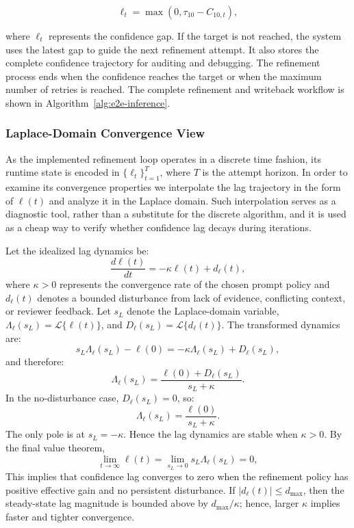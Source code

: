 \documentclass[pdflatex,sn-basic]{sn-jnl}
\begin{document}
\begin{equation}
\ell_t=\max(0,\tau_{10}-C_{10,t}),
\end{equation}

where $\ell_t$ represents the confidence gap. If the target is not reached,
the system uses the latest gap to guide the next refinement attempt. It also
stores the complete confidence trajectory for auditing and debugging. The
refinement process ends when the confidence reaches the target or when the
maximum number of retries is reached.
The complete refinement and writeback workflow is shown in Algorithm~\ref{alg:e2e-inference}.

\subsubsection{Laplace-Domain Convergence View}

As the implemented refinement loop operates in a discrete time fashion, its runtime state is encoded in \(\{\ell_t\}_{t=1}^{T}\), where $T$ is the attempt horizon. In order to examine its convergence properties we interpolate the lag trajectory in the form of \(\ell(t)\) and analyze it in the Laplace domain. Such interpolation serves as a diagnostic tool, rather than a substitute for the discrete algorithm, and it is used as a cheap way to verify whether confidence lag decays during iterations.

Let the idealized lag dynamics be:
\begin{equation}
\frac{d\ell(t)}{dt} = -\kappa \ell(t) + d_{\ell}(t),
\end{equation}
where \(\kappa>0\) represents the convergence rate of the chosen prompt policy and \(d_{\ell}(t)\) denotes a bounded disturbance from lack of evidence, conflicting context, or reviewer feedback. Let $s_L$ denote the Laplace-domain variable, $\Lambda_{\ell}(s_L)=\mathcal{L}\{\ell(t)\}$, and $D_{\ell}(s_L)=\mathcal{L}\{d_{\ell}(t)\}$. The transformed dynamics are:
\begin{equation}
s_L\Lambda_{\ell}(s_L)-\ell(0)=-\kappa\Lambda_{\ell}(s_L)+D_{\ell}(s_L),
\end{equation}
and therefore:
\begin{equation}
\Lambda_{\ell}(s_L)=\frac{\ell(0)+D_{\ell}(s_L)}{s_L+\kappa}.
\end{equation}
In the no-disturbance case, \(D_{\ell}(s_L)=0\), so:
\begin{equation}
\Lambda_{\ell}(s_L)=\frac{\ell(0)}{s_L+\kappa}.
\end{equation}
The only pole is at \(s_L=-\kappa\). Hence the lag dynamics are stable when \(\kappa>0\). By the final value theorem,
\begin{equation}
\lim_{t\to\infty}\ell(t)=\lim_{s_L\to 0}s_L\Lambda_{\ell}(s_L)=0,
\end{equation}
This implies that confidence lag converges to zero when the refinement policy has positive effective gain and no persistent disturbance. If $|d_{\ell}(t)|\le d_{\max}$, then the steady-state lag magnitude is bounded above by $d_{\max}/\kappa$; hence, larger \(\kappa\) implies faster and tighter convergence.
\end{document}

